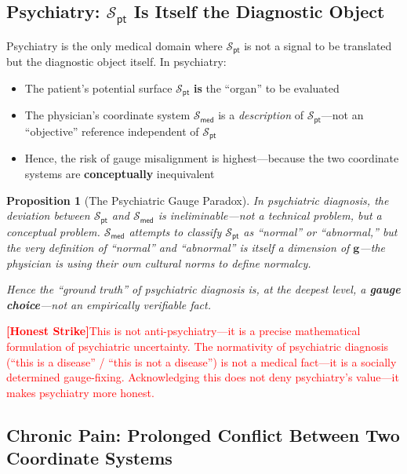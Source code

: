 \documentclass[12pt,a4paper]{article}
\newtheorem{proposition}[theorem]{Proposition}
\theoremstyle{remark}
\newcommand{\med}{\textsf{med}}
\newcommand{\pt}{\textsf{pt}}
\newcommand{\honestcrit}[1]{%
    \textcolor{red}{\textbf{[Honest Strike]}#1}%
}
\begin{document}
\subsection{Psychiatry: $\mathcal{S}_{\pt}$ Is Itself the Diagnostic Object}

Psychiatry is the only medical domain where $\mathcal{S}_{\pt}$ is not a signal to be translated but the diagnostic object itself. In psychiatry:

\begin{itemize}
    \item The patient's potential surface $\mathcal{S}_{\pt}$ \textbf{is} the ``organ'' to be evaluated
    \item The physician's coordinate system $\mathcal{S}_{\med}$ is a \emph{description} of $\mathcal{S}_{\pt}$---not an ``objective'' reference independent of $\mathcal{S}_{\pt}$
    \item Hence, the risk of gauge misalignment is highest---because the two coordinate systems are \textbf{conceptually} inequivalent
\end{itemize}

\begin{proposition}[The Psychiatric Gauge Paradox]\label{prop:psychiatry_paradox}
In psychiatric diagnosis, the deviation between $\mathcal{S}_{\pt}$ and $\mathcal{S}_{\med}$ is ineliminable---not a technical problem, but a conceptual problem. $\mathcal{S}_{\med}$ attempts to classify $\mathcal{S}_{\pt}$ as ``normal'' or ``abnormal,'' but the very definition of ``normal'' and ``abnormal'' is itself a dimension of $\mathbf{g}$---the physician is using their own cultural norms to define normalcy.

Hence the ``ground truth'' of psychiatric diagnosis is, at the deepest level, a \textbf{gauge choice}---not an empirically verifiable fact.
\end{proposition}

\honestcrit{This is not anti-psychiatry---it is a precise mathematical formulation of psychiatric uncertainty. The normativity of psychiatric diagnosis (``this is a disease'' / ``this is not a disease'') is not a medical fact---it is a socially determined gauge-fixing. Acknowledging this does not deny psychiatry's value---it makes psychiatry more honest.}

\subsection{Chronic Pain: Prolonged Conflict Between Two Coordinate Systems}
\end{document}
